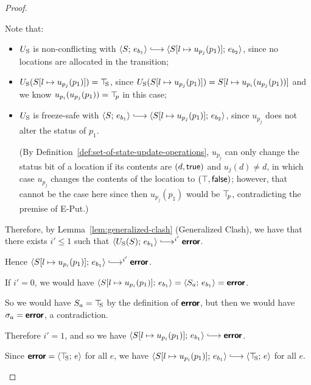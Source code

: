 \begin{proof}
\begin{enumerate}
\begin{enumerate}
\begin{itemize}
\begin{itemize}
          Note that:
          \begin{itemize}
          \item $U_{\mathrm{S}}$ is non-conflicting with $\config{S}{e_{b_1}}
            \parstepsto
            \config{\extSRaw{S}{l}{u_{p_j}(p_1)}}{e_{b_2}}$, since
            no locations are allocated in the transition;
          \item $U_{\mathrm{S}}(S[l \mapsto u_{p_j}(p_1)]) = \top\hspace{-0.85mm}_{\mathrm{S}}$, since
            $U_{\mathrm{S}}(S[l \mapsto u_{p_j}(p_1)]) =
            S[l \mapsto u_{p_i}(u_{p_j}(p_1))]$ and we know
            $u_{p_i}(u_{p_j}(p_1)) = \top\hspace{-0.85mm}_{p}$ in this case;
          \item $U_{\mathrm{S}}$ is freeze-safe with $\config{S}{e_{b_1}}
            \parstepsto
            \config{\extSRaw{S}{l}{u_{p_j}(p_1)}}{e_{b_2}}$, since
            $u_{p_j}$ does not alter the status of $p_1$.

            (By Definition~\ref{def:set-of-state-update-operations},
            $u_{p_j}$ can only change the status bit of a location if
            its contents are $(d, \textsf{true})$ and $u_j(d) \neq
            d$, in which case $u_{p_j}$ changes the contents of the
            location to $(\top, \textsf{false})$; however, that
            cannot be the case here since then $u_{p_j}(p_1)$ would be
            $\top\hspace{-0.85mm}_{p}$, contradicting the premise of {\sc E-Put}.)
          \end{itemize}

          Therefore, by Lemma~\ref{lem:generalized-clash}
          (Generalized Clash), we have that there exists $i' \leq 1$
          such that $\config{\Ustore(S)}{e_{b_1}} \parstepsto^{i'}
          \error$.

          Hence $\config{\extSRaw{S}{l}{u_{p_i}(p_1)}}{e_{b_1}}
          \parstepsto^{i'} \error$.

          If $i' = 0$, we would have
          $\langle S[l \mapsto u_{p_i}(p_1)];\, e_{b_1} \rangle =
          \langle S_a;\, e_{b_1} \rangle = \textbf{\textsf{error}}$.

          So we would have $S_a = \top\hspace{-0.85mm}_{\mathrm{S}}$ by the definition of
          $\textbf{\textsf{error}}$, but then we would have $\sigma_a = \textbf{\textsf{error}}$, a
          contradiction.

          Therefore $i' = 1$, and so we have
          $\config{\extSRaw{S}{l}{u_{p_i}(p_1)}}{e_{b_1}} \parstepsto
          \error$.

          Since $\textbf{\textsf{error}} = \langle \top\hspace{-0.85mm}_{\mathrm{S}};\, e \rangle$ for all $e$, we have
          $\config{\extSRaw{S}{l}{u_{p_i}(p_1)}}{e_{b_1}}
          \parstepsto \config{\topS}{e}$ for all $e$.


\end{itemize}
\end{itemize}
\end{enumerate}
\end{enumerate}
\end{proof}
